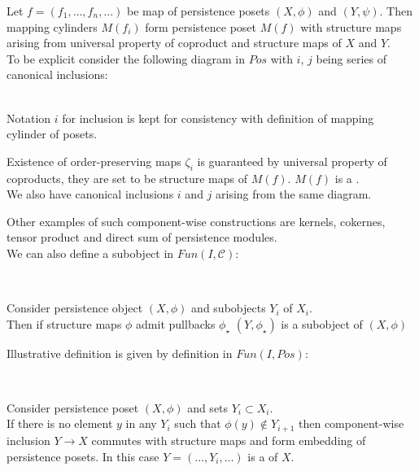 \begin{definition}
  Let $f = (f_1,\ldots,f_n,\ldots)$ be map of persistence posets $(X, \phi)$ and $(Y, \psi)$. Then mapping cylinders $M(f_i)$ form persistence poset $M(f)$ with structure maps arising from universal property of coproduct and structure maps of $X$ and $Y$.\\

  To be explicit consider the following diagram in $Pos$ with $i$, $j$ being series of canonical inclusions:\\
  \\
  Notation $i$ for inclusion is kept for consistency with definition of mapping cylinder of posets.

  Existence of order-preserving maps $\zeta_i$ is guaranteed by universal property of coproducts, they are set to be structure maps of $M(f)$. $M(f)$ is a .\\

  We also have canonical inclusions $i$ and $j$ arising from the same diagram.
\end{definition}

Other examples of such component-wise constructions are kernels, cokernes, tensor product and direct sum of persistence modules.\\

We can also define a subobject in $Fun(I, \mathcal{C})$:

\begin{definition} ~ \par
  Consider persistence object $(X,\phi)$ and subobjects $Y_i$ of $X_i$.\\

  Then if structure maps $\phi$ admit pullbacks $\phi_{\star}$ $(Y,\phi_{\star})$ is a subobject of $(X, \phi)$
\end{definition}

Illustrative definition is given by definition in $Fun(I, Pos)$:\\

\begin{definition} ~ \par
  Consider persistence poset $(X,\phi)$ and sets $Y_i \subset X_i$.\\

  If there is no element $y$ in any $Y_i$ such that $\phi(y) \not\in Y_{i+1}$ then component-wise inclusion $Y \to X$ commutes with structure maps and form embedding of persistence posets. In this case $Y=(\ldots,Y_i,\ldots)$ is a  of $X$.
\end{definition}


